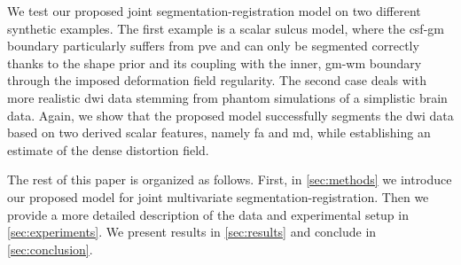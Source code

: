 We test our proposed joint segmentation-registration model on two different 
synthetic examples. The first example is a scalar sulcus model, where the 
\gls{csf}-\gls{gm} boundary particularly suffers from \gls{pve} and can only be 
segmented correctly thanks to the shape prior and its coupling with the inner, 
\gls{gm}-\gls{wm} boundary through the imposed deformation field regularity. 
The second case deals with more realistic \gls{dwi} data stemming from 
phantom simulations of a simplistic brain data. Again, we show that the 
proposed model successfully segments the \gls{dwi} data based on two derived 
scalar features, namely \gls{fa} and \gls{md}, while establishing an estimate 
of the dense distortion field.

The rest of this paper is organized as follows. First, in \autoref{sec:methods}
we introduce our proposed model for joint multivariate segmentation-registration.
Then we provide a more detailed description of the data and experimental setup in
\autoref{sec:experiments}. We present results in \autoref{sec:results} and conclude 
in \autoref{sec:conclusion}.